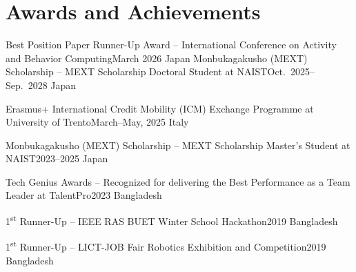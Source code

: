 \section{Awards and Achievements}
\cvSubHeadingListStart
\cvSubSubheading
{Best Position Paper Runner-Up Award -- International Conference on Activity and Behavior Computing}{March 2026 Japan}
\cvSubSubheading
{Monbukagakusho (MEXT) Scholarship -- MEXT Scholarship Doctoral Student at NAIST}{Oct.\ 2025--Sep.\ 2028 Japan}

\cvSubSubheading
{Erasmus+ International Credit Mobility (ICM) Exchange Programme at University of Trento}{March--May, 2025 Italy}

\cvSubSubheading
{Monbukagakusho (MEXT) Scholarship -- MEXT Scholarship Master's Student at NAIST}{2023--2025 Japan}



\cvSubSubheading
{Tech Genius Awards -- Recognized for delivering the Best Performance as a Team Leader at TalentPro}{2023 Bangladesh}

\cvSubSubheading
{1\textsuperscript{st} Runner-Up -- IEEE RAS BUET Winter School Hackathon}{2019 Bangladesh}

\cvSubSubheading
{1\textsuperscript{st} Runner-Up -- LICT-JOB Fair Robotics Exhibition and Competition}{2019 Bangladesh}

\vspace{5pt}
\cvSubHeadingListEnd
